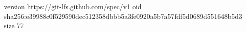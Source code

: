 version https://git-lfs.github.com/spec/v1
oid sha256:e39988c0f529590dec512358dbbb5a3fe0920a5b7a57fdf5d0689d551648b5d3
size 77
